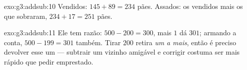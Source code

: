 \begin{solution}{exo:g3:addsub:10}
Vendidos: $145 + 89 = 234$ pães. Assados: os vendidos mais os que
sobraram, $234 + 17 = 251$ pães.
\end{solution}

\begin{solution}{exo:g3:addsub:11}
Ele tem razão: $500 - 200 = 300$, mais $1$ dá $301$; armando a
conta, $500 - 199 = 301$ também. Tirar $200$ retira \emph{um a
mais}, então é preciso devolver esse um --- subtrair um vizinho
amigável e corrigir costuma ser mais rápido que pedir emprestado.
\end{solution}
